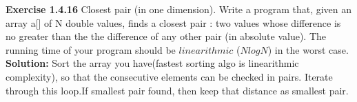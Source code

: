 \documentclass[11pt,fleqn]{article}
\begin{document}
\textbf{Exercise 1.4.16} Closest pair (in one dimension). Write a program that, given an array a[] of N
double values, finds a closest pair : two values whose difference is no greater than the
the difference of any other pair (in absolute value). The running time of your program
should be $linearithmic$ ($NlogN$) in the worst case.\\

\textbf{Solution:} Sort the array you have(fastest sorting algo is linearithmic complexity), so that the consecutive elements can be checked in pairs. Iterate through this loop.If smallest pair found, then keep that distance as smallest pair.
\end{document}
